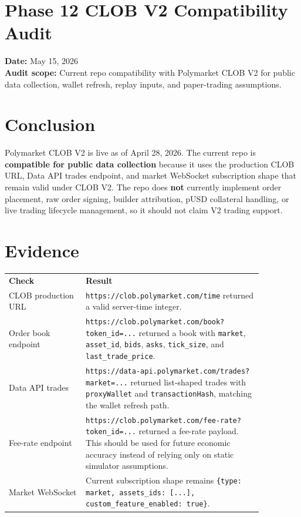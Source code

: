 \documentclass{article}
\begin{document}
\section*{Phase 12 CLOB V2 Compatibility Audit}

\textbf{Date:} May 15, 2026\\
\textbf{Audit scope:} Current repo compatibility with Polymarket CLOB V2 for public data collection, wallet refresh, replay inputs, and paper-trading assumptions.

\section*{Conclusion}
Polymarket CLOB V2 is live as of April 28, 2026. The current repo is \textbf{compatible for public data collection} because it uses the production CLOB URL, Data API trades endpoint, and market WebSocket subscription shape that remain valid under CLOB V2. The repo does \textbf{not} currently implement order placement, raw order signing, builder attribution, pUSD collateral handling, or live trading lifecycle management, so it should not claim V2 trading support.

\section*{Evidence}
\begin{longtable}{p{0.26\linewidth}p{0.60\linewidth}}
\textbf{Check} & \textbf{Result} \\
CLOB production URL & \texttt{https://clob.polymarket.com/time} returned a valid server-time integer. \\
Order book endpoint & \texttt{https://clob.polymarket.com/book?token\_id=...} returned a book with \texttt{market}, \texttt{asset\_id}, \texttt{bids}, \texttt{asks}, \texttt{tick\_size}, and \texttt{last\_trade\_price}. \\
Data API trades & \texttt{https://data-api.polymarket.com/trades?market=...} returned list-shaped trades with \texttt{proxyWallet} and \texttt{transactionHash}, matching the wallet refresh path. \\
Fee-rate endpoint & \texttt{https://clob.polymarket.com/fee-rate?token\_id=...} returned a fee-rate payload. This should be used for future economic accuracy instead of relying only on static simulator assumptions. \\
Market WebSocket & Current subscription shape remains \texttt{\{type: market, assets\_ids: [...], custom\_feature\_enabled: true\}}. \\
\end{longtable}
\end{document}
